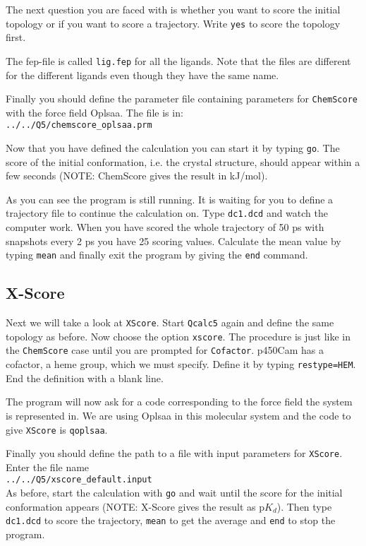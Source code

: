 \documentclass[a4paper,12pt]{article}
\newcommand{\subsctn}[1]{\subsection{#1}}
\newcommand{\qcalc}{\texttt{Qcalc5}}
\newcommand{\chemscore} {\texttt{ChemScore}}
\newcommand{\xscore} {\texttt{X\-Score}}
\begin{document}
\noindent The next question you are faced with is whether you want
to score the initial topology or if you want to score a
trajectory. Write \texttt{yes} to score the topology first.

\noindent The fep-file is called \texttt{lig.fep} for all the
ligands. Note that the files are different for the
different ligands even though they have the same name.

\noindent Finally you should define the parameter file containing
parameters for {\chemscore} with the force field Oplsaa. The file
is
in:\\
\texttt{../../Q5/chemscore\_oplsaa.prm
}

\noindent Now that you have defined the calculation you can start
it by typing \texttt{go}. The score of the initial conformation,
i.e. the crystal structure, should appear within a few seconds
(NOTE: ChemScore gives the result in kJ/mol).

As you can see the program is still running. It is waiting for you
to define a trajectory file to continue the calculation on. Type
\texttt{dc1.dcd} and watch the computer work. When you have scored
the whole trajectory of 50 ps with snapshots every 2 ps you have
25 scoring values. Calculate the mean value by typing
\texttt{mean} and finally exit the program by giving the
\texttt{end} command.

\subsctn {X-Score}

Next we will take a look at {\xscore}. Start {\qcalc} again and
define the same topology as before. Now choose the option
\texttt{xscore}. The procedure is just like in the {\chemscore}
case until you are prompted for \texttt{Cofactor}. p450Cam has a
cofactor, a heme group, which we must specify. Define it by typing
\texttt{restype=HEM}. End the definition with a blank line.

\noindent The program will now ask for a code corresponding to the
force field the system is represented in. We are using Oplsaa in
this molecular system and the code to give {\xscore} is
\texttt{qoplsaa}.

\noindent Finally you should define the path to a file with input
parameters for {\xscore}. Enter the file name\\
\texttt{../../Q5/xscore\_default.input}\\

\noindent As before, start the calculation with \texttt{go} and
wait until the score for the initial conformation appears (NOTE: 
X-Score gives the result as p$K_{d}$). Then
type \texttt{dc1.dcd} to score the trajectory, \texttt{mean} to
get the average and \texttt{end} to stop the program.
\end{document}
